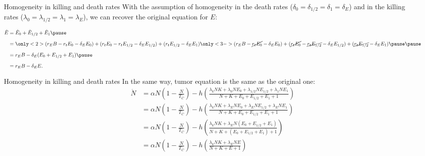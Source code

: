 \documentclass[aspectratio=169,xcolor=dvipsnames]{beamer}
\begin{document}
\begin{frame}{Homogeneity in killing and death rates}
    With the assumption of homogeneity in the death rates ($\delta_0 = \delta_{1/2} = \delta_1 = \delta_E$) and in the killing rates ($\lambda_0 = \lambda_{1/2} = \lambda_1 = \lambda_E$), we can recover the original equation for $E$:
    
    \vspace{0.3cm}
    \begin{equation*}
    \begin{aligned}
        \dot{E} &= \dot{E}_0 + \dot{E}_{1/2} + \dot{E}_1 
        \pause \\[1.5ex]
        &= \only<2>{(r_E B - r_t E_0 - \delta_E E_0) + (r_t E_0 - r_t E_{1/2} - \delta_E E_{1/2}) + (r_t E_{1/2} - \delta_E E_1)}%
           \only<3->{(r_E B - \cancel{r_t E_0} - \delta_E E_0) + (\cancel{r_t E_0} - \cancel{r_t E_{1/2}} - \delta_E E_{1/2}) + (\cancel{r_t E_{1/2}} - \delta_E E_1)}
        \pause\pause \\[1.5ex] %
                &= r_E B - \delta_E (E_0 + E_{1/2} + E_1) 
        \pause \\[1.5ex]
                &= r_E B - \delta_E E.
    \end{aligned}
    \end{equation*}
\end{frame}

\begin{frame}{Homogeneity in killing and death rates}
    In the same way, tumor equation is the same as the original one:
    \vspace{0.2cm}
    \begin{equation}
    \begin{aligned}
        \dot{N} &= \alpha N \left( 1 - \frac{N}{T_C} \right) - h \left( \frac{\lambda_k N K + \lambda_0 N E_0 + \lambda_{1/2} N E_{1/2} + \lambda_1 N E_1}{N + K + E_0 + E_{1/2} + E_1 + 1} \right) \\[1ex]
                &= \alpha N \left( 1 - \frac{N}{T_C} \right) - h \left( \frac{\lambda_k N K + \lambda_E N E_0 + \lambda_E N E_{1/2} + \lambda_E N E_1}{N + K + E_0 + E_{1/2} + E_1 + 1} \right) \\[1ex]
                &= \alpha N \left( 1 - \frac{N}{T_C} \right) - h \left( \frac{\lambda_k N K + \lambda_E N (E_0 + E_{1/2} + E_1)}{N + K + (E_0 + E_{1/2} + E_1) + 1} \right) \\[1ex]
                &= \alpha N \left( 1 - \frac{N}{T_C} \right) - h \left( \frac{\lambda_k N K + \lambda_E N E}{N + K + E + 1} \right)
    \end{aligned}
    \end{equation}
\end{frame}
\end{document}
